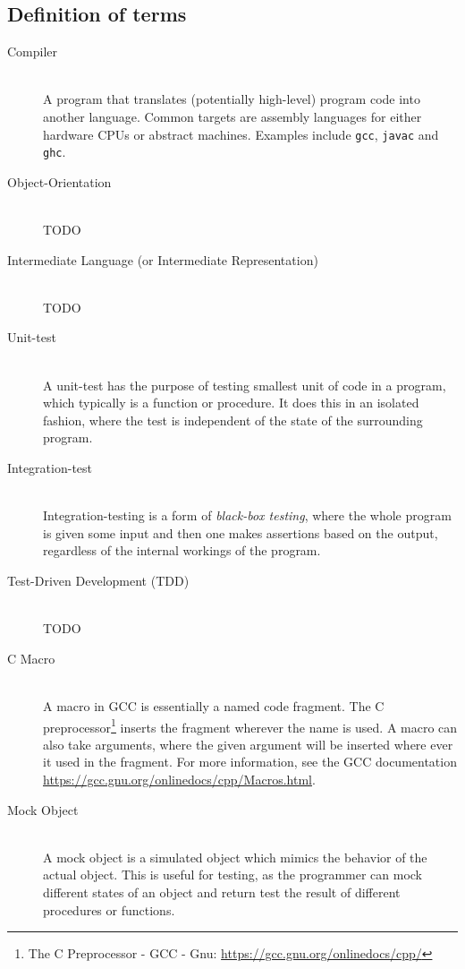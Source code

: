 
\subsection{Definition of terms}
\begin{description}
\item[Compiler] \hfill \\
  A program that translates (potentially high-level) program code into
  another language. Common targets are assembly languages for either
  hardware CPUs or abstract machines. Examples include
  \texttt{gcc}\cite{NEEDED}, \texttt{javac}\cite{NEEDED} and
  \texttt{ghc}\cite{NEEDED}.

\item[Object-Orientation] \hfill \\
  TODO

\item[Intermediate Language (or Intermediate Representation)] \hfill \\
  TODO

\item[Unit-test] \hfill \\
  A unit-test has the purpose of testing smallest unit of code in a
  program, which typically is a function or procedure. It does this in
  an isolated fashion, where the test is independent of the state of
  the surrounding program.

\item[Integration-test] \hfill \\
  Integration-testing is a form of {\it black-box testing}, where the
  whole program is given some input and then one makes assertions
  based on the output, regardless of the internal workings of the
  program.

\item[Test-Driven Development (TDD)] \hfill \\
  TODO

\item[C Macro] \hfill \\
  A macro in GCC is essentially a named code fragment. The C
  preprocessor\footnote{The C Preprocessor - GCC - Gnu:
    \url{https://gcc.gnu.org/onlinedocs/cpp/}} inserts the fragment
  wherever the name is used. A macro can also take arguments, where
  the given argument will be inserted where ever it used in the
  fragment. For more information, see the GCC documentation
  \url{https://gcc.gnu.org/onlinedocs/cpp/Macros.html}.

\item[Mock Object] \hfill \\
  A mock object is a simulated object which mimics the behavior of the
  actual object. This is useful for testing, as the programmer can
  mock different states of an object and return test the result of
  different procedures or functions. %

\end{description}


\label{sec:spec}

